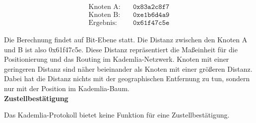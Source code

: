 \begin{equation}
    \begin{aligned}
        \text{Knoten A:} & \quad \texttt{0x83a2c8f7} \\
        \text{Knoten B:} & \quad \texttt{0xe1b6d4a9} \\
        \text{Ergebnis:} & \quad \texttt{0x61f47c5e}
    \end{aligned}
\end{equation}

\noindent Die Berechnung findet auf Bit-Ebene statt. Die Distanz zwischen den Knoten A und B ist also 0x61f47c5e. Diese Distanz repräsentiert die Maßeinheit für die Positionierung und das Routing im Kademlia-Netzwerk. Knoten mit einer geringeren Distanz sind näher beieinander als Knoten mit einer größeren Distanz. Dabei hat die Distanz nichts mit der geographischen Entfernung zu tun, sondern nur mit der Position im Kademlia-Baum.
\\

\noindent \textbf{Zustellbestätigung}

\noindent Das Kademlia-Protokoll bietet keine Funktion für eine Zustellbestätigung.